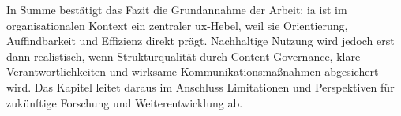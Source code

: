In Summe bestätigt das Fazit die Grundannahme der Arbeit: \Gls{ia} ist im organisationalen Kontext ein zentraler \Gls{ux}-Hebel, weil sie Orientierung, Auffindbarkeit und Effizienz direkt prägt. Nachhaltige Nutzung wird jedoch erst dann realistisch, wenn Strukturqualität durch Content-Governance, klare Verantwortlichkeiten und wirksame Kommunikationsmaßnahmen abgesichert wird. Das Kapitel leitet daraus im Anschluss Limitationen und Perspektiven für zukünftige Forschung und Weiterentwicklung ab.

\vspace{1em}




